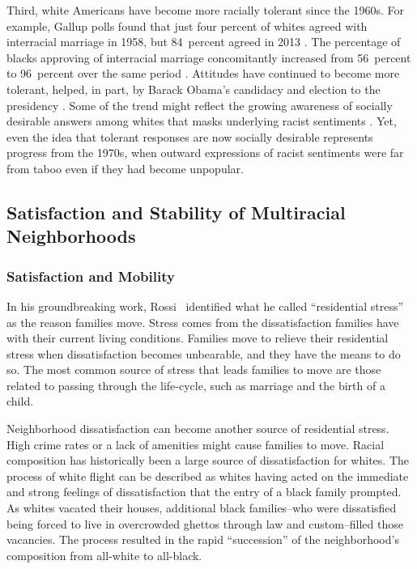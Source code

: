 \documentclass{baderart}
\renewcommand{\needcite}[1][]{%
	\strong{[CITE: %
		\ifthenelse{\equal{#1}{}}{}{: #1}	%
	]}}
\begin{document}
Third, white Americans have become more racially tolerant since the 1960s. For example, Gallup polls found that just four percent of whites agreed with interracial marriage in 1958, but 84~percent agreed in 2013 \citep{newport_in_2013}. The percentage of blacks approving of interracial marriage concomitantly increased from 56~percent to 96~percent over the same period \citep{newport_in_2013}. Attitudes have continued to become more tolerant, helped, in part, by Barack Obama's candidacy and election to the presidency \needcite. Some of the trend might reflect the growing awareness of socially desirable answers among whites that masks underlying racist sentiments \needcite. Yet, even the idea that tolerant responses are now socially desirable represents progress from the 1970s, when outward expressions of racist sentiments were far from taboo even if they had become unpopular.

\subsection{Satisfaction and Stability of Multiracial Neighborhoods}\label{sec:satisfaction-stability}

\subsubsection{Satisfaction and Mobility}\label{satisfaction-and-mobility}

In his groundbreaking work, Rossi \needcite\ identified what he called ``residential stress'' as the reason families move. Stress comes from the dissatisfaction families have with their current living conditions. Families move to relieve their residential stress when dissatisfaction becomes unbearable, and they have the means to do so. The most common source of stress that leads families to move are those related to passing through the life-cycle, such as marriage and the birth of a child. 

Neighborhood dissatisfaction can become another source of residential stress. High crime rates or a lack of amenities might cause families to move. Racial composition has historically been a large source of dissatisfaction for whites. The process of white flight can be described as whites having acted on the immediate and strong feelings of dissatisfaction that the entry of a black family prompted. As whites vacated their houses, additional black families--who were dissatisfied being forced to live in overcrowded ghettos through law and custom--filled those vacancies. The process resulted in the rapid ``succession'' of the neighborhood's composition from all-white to all-black.
\end{document}
